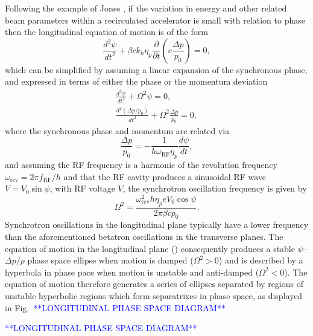 \documentclass[../main.tex]{subfiles}
\begin{document}
Following the example of Jones \cite{jones2016design}, if the variation in energy and other related beam parameters within a recirculated accelerator is small with relation to phase then the longitudinal equation of motion is of the form 
\begin{equation}
\frac{d^{2}\psi}{dt^{2}} + \beta ck_{h}\eta_{p}\frac{\partial}{\partial t}\left(c\frac{\Delta p}{p_{0}}\right) = 0,
\label{eq:longitudinal_equation_of_motion}
\end{equation}
which can be simplified by assuming a linear expansion of the synchronous phase, and expressed in terms of either the phase or the momentum deviation
\begin{align}
\frac{d^{2}\psi}{dt^{2}} + \Omega^{2}\psi = 0,
\label{eq:longitudinal_equation_of_motion_phase} \\
\frac{d^{2}\left(\Delta p/p_{0}\right)}{dt^{2}} + \Omega^{2}\frac{\Delta p}{p_{0}} = 0,
\label{eq:longitudinal_equation_of_motion_momentum}
\end{align}
where the synchronous phase and momentum are related via
\begin{equation}
\frac{\Delta p}{p_{0}} = -\frac{1}{h\omega_{\mathrm{RF}}\eta_{p}}\frac{d\psi}{dt},
\label{eq:momentum_synchronous_phase_relation}    
\end{equation}
and assuming the RF frequency is a harmonic of the revolution frequency $\omega_{\mathrm{rev}}=2\pi f_{\mathrm{RF}}/h$ and that the RF cavity produces a sinusoidal RF wave $V=V_{0}\sin\psi$, with RF voltage $V$, the synchrotron oscillation frequency is given by
\begin{equation}
\Omega^{2} = \frac{\omega_{\mathrm{rev}}^{2}h\eta_{p}eV_{0}\cos\psi}{2\pi\beta cp_{0}}.
\label{eq:synchrotron_oscillation_frequency}    
\end{equation}
Synchrotron oscillations in the longitudinal plane typically have a lower frequency than the aforementioned betatron oscillations in the transverse planes. The equation of motion in the longitudinal plane () consequently produces a stable $\psi$--$\Delta p/p$ phase space ellipse when motion is damped ($\Omega^{2}>0$) and is described by a hyperbola in phase pace when motion is unstable and anti-damped ($\Omega^{2}<0$). The equation of motion therefore generates a series of ellipses separated by regions of unstable hyperbolic regions which form separatrixes in phase space, as displayed in Fig.~\textcolor{blue}{**LONGITUDINAL PHASE SPACE DIAGRAM**}

\textcolor{blue}{**LONGITUDINAL PHASE SPACE DIAGRAM**}
\end{document}
